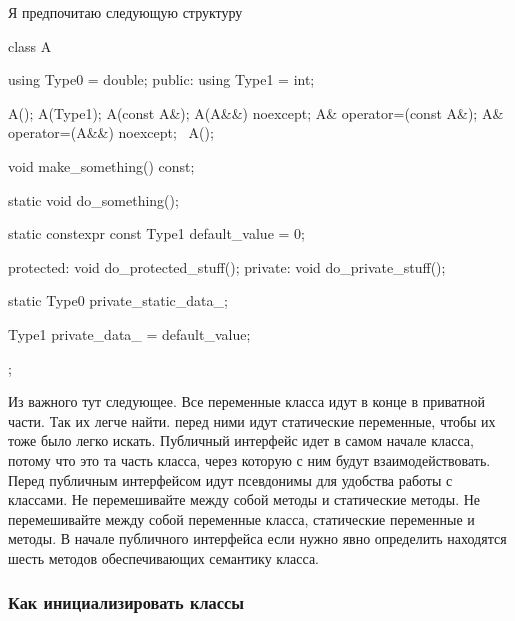 Я предпочитаю следующую структуру
\begin{cppcode}
class A {
  using Type0 = double;
public:
  using Type1 = int;

  A();
  A(Type1);
  A(const A&);
  A(A&&) noexcept;
  A& operator=(const A&);
  A& operator=(A&&) noexcept;
  ~A();
  
  void make_something() const;
  
  static  void do_something();
  
  static constexpr const Type1 default_value = 0;

protected:
  void do_protected_stuff();
private:
  void do_private_stuff();

  static Type0 private_static_data_;
  
  Type1 private_data_ = default_value;
};
\end{cppcode}
Из важного тут следующее.
Все переменные класса идут в конце в приватной части.
Так их легче найти.
перед ними идут статические переменные, чтобы их тоже было легко искать.
Публичный интерфейс идет в самом начале класса, потому что это та часть класса, через которую с ним будут взаимодействовать.
Перед публичным интерфейсом идут псевдонимы для удобства работы с классами.
Не перемешивайте между собой методы и статические методы.
Не перемешивайте между собой переменные класса, статические переменные и методы.
В начале публичного интерфейса если нужно явно определить находятся шесть методов обеспечивающих семантику класса.

\subsubsection{Как инициализировать классы}
\label{section::InitClass}

